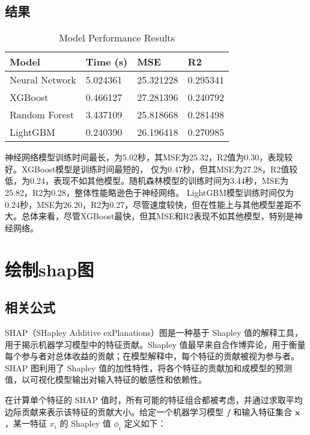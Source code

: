 \documentclass[AutoFakeBold]{LZUThesis-PgD&PhD}
\begin{document}
	\subsection{结果}
		\begin{table}[H]
		\centering
		\begin{tabular}{|l|l|l|l|}
			\hline
			\textbf{Model}       & \textbf{Time (s)} & \textbf{MSE}    & \textbf{R2}    \\ \hline
			Neural Network       & 5.024361          & 25.321228       & 0.295341       \\ \hline
			XGBoost              & 0.466127          & 27.281396       & 0.240792       \\ \hline
			Random Forest        & 3.437109          & 25.818668       & 0.281498       \\ \hline
			LightGBM             & 0.240390          & 26.196418       & 0.270985       \\ \hline
		\end{tabular}
		\caption{Model Performance Results}
		\label{tab:model_performance}
	\end{table}
	
	神经网络模型训练时间最长，为5.02秒，其MSE为25.32，R2值为0.30，表现较好。XGBoost模型是训练时间最短的，
    仅为0.47秒，但其MSE为27.28，R2值较低，为0.24，表现不如其他模型。随机森林模型的训练时间为3.44秒，MSE为25.82，R2为0.28，整体性能略逊色于神经网络。
    LightGBM模型训练时间仅为0.24秒，MSE为26.20，R2为0.27，尽管速度较快，但在性能上与其他模型差距不大。总体来看，尽管XGBoost最快，但其MSE和R2表现不如其他模型，特别是神经网络。

\section{绘制shap图}


\subsection{相关公式}


SHAP（SHapley Additive exPlanations）图是一种基于 Shapley 值的解释工具，用于揭示机器学习模型中的特征贡献。Shapley 值最早来自合作博弈论，用于衡量每个参与者对总体收益的贡献；在模型解释中，每个特征的贡献被视为参与者。SHAP 图利用了 Shapley 值的加性特性，将各个特征的贡献加和成模型的预测值，以可视化模型输出对输入特征的敏感性和依赖性。

在计算单个特征的 SHAP 值时，所有可能的特征组合都被考虑，并通过求取平均边际贡献来表示该特征的贡献大小。给定一个机器学习模型 \( f \) 和输入特征集合 \( \mathbf{x} \)，某一特征 \( x_i \) 的 Shapley 值 \( \phi_i \) 定义如下：
\end{document}
